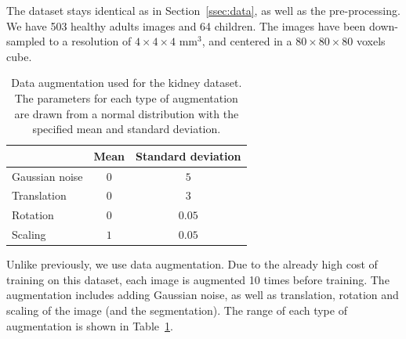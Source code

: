 
The dataset stays identical as in Section~\ref{ssec:data}, as well as the pre-processing. We have 503 healthy adults images and 64 children. The images have been down-sampled to a resolution of $4 \times 4 \times 4$ mm$^3$, and centered in a $80 \times 80 \times 80$ voxels cube. 

\begin{table}[htb]
	\centering
	\begin{tabular}{|l|c|c|}
	    \hline
                        & Mean & Standard deviation \\
        \hline
         Gaussian noise & $0$ & $5$ \\
         Translation & $0$ & $3$ \\
         Rotation & $0$ & $0.05$ \\
         Scaling & $1$ & $0.05$ \\
        \hline
    \end{tabular}
	\caption[Data augmentation used for the kidney dataset]{Data augmentation used for the kidney dataset. The parameters for each type of augmentation are drawn from a normal distribution with the specified mean and standard deviation.}
	\label{table:data_aug}
\end{table}

Unlike previously, we use data augmentation. Due to the already high cost of training on this dataset, each image is augmented 10 times before training. The augmentation includes adding Gaussian noise, as well as translation, rotation and scaling of the image (and the segmentation). The range of each type of augmentation is shown in Table~\ref{table:data_aug}. %

